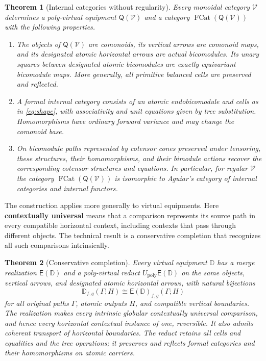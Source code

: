 \documentclass[11pt,reqno]{amsart}
\theoremstyle{plain}
\newtheorem{theorem}{Theorem}[section]
\theoremstyle{definition}
\theoremstyle{remark}
\numberwithin{equation}{section}
\newcommand{\D}{\mathbb D}
\newcommand{\V}{\mathcal V}
\newcommand{\E}{\mathsf E}
\newcommand{\Q}{\mathsf Q}
\newcommand{\Up}{U_{\mathrm{poly}}}
\newcommand{\FCat}{\operatorname{FCat}}
\begin{document}
\begin{theorem}[Internal categories without regularity]\label{thm:main}
Every monoidal category $\V$ determines a poly-virtual equipment $\Q(\V)$
and a category $\FCat(\Q(\V))$ with the following properties.
\begin{enumerate}
\item The objects of $\Q(\V)$ are comonoids, its vertical arrows are
comonoid maps, and its designated atomic horizontal arrows are actual
bicomodules. Its unary squares between designated atomic bicomodules are
exactly equivariant bicomodule maps.
More generally, all primitive balanced cells are preserved and reflected.
\item A formal internal category consists of an atomic endobicomodule
and cells as in \cref{eq:shape}, with associativity and unit equations
given by tree substitution. Homomorphisms have ordinary forward variance
and may change the comonoid base.
\item On bicomodule paths represented by cotensor cones preserved under
tensoring, these structures, their homomorphisms, and their bimodule
actions recover the corresponding cotensor structures and equations.
In particular, for regular $\V$ the category $\FCat(\Q(\V))$ is
isomorphic to Aguiar's category of internal categories and internal functors.
\end{enumerate}
\end{theorem}

The construction applies more generally to virtual equipments. Here
\textbf{contextually universal} means that a comparison represents its
source path in every compatible horizontal context, including contexts
that pass through different objects. The technical result is a conservative
completion that recognizes all such comparisons intrinsically.

\begin{theorem}[Conservative completion]\label{thm:maincompletion}
Every virtual equipment $\D$ has a merge realization $\E(\D)$ and
a poly-virtual reduct $\Up\E(\D)$ on the same objects, vertical
arrows, and designated atomic horizontal arrows, with natural bijections
\[
 \D_{f,g}(\Gamma;H)\cong\E(\D)_{f,g}(\Gamma;H)
\]
for all original paths $\Gamma$, atomic outputs $H$, and compatible
vertical boundaries. The realization makes every intrinsic globular
contextually universal comparison, and hence every horizontal contextual
instance of one, reversible. It also admits coherent transport of horizontal
boundaries. The reduct retains all cells and equalities and the tree
operations; it preserves and reflects formal categories and their
homomorphisms on atomic carriers.
\end{theorem}
\end{document}
